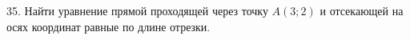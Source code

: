 35. Найти уравнение прямой проходящей через точку $A(3;2)$ и отсекающей на осях координат равные по длине отрезки.\\
